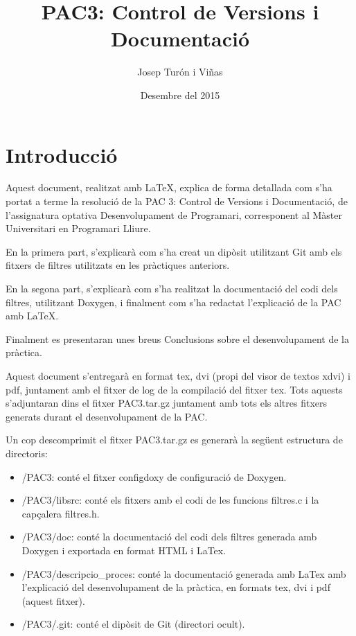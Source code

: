\documentclass{article}
\begin{document}
\title{PAC3: Control de Versions i Documentació} 
\author{Josep Turón i Viñas}
\date{Desembre del 2015}
\maketitle
\newpage
\section{Introducció}
Aquest document, realitzat amb \LaTeX, explica de forma detallada com s'ha portat a terme la resolució de la PAC 3: Control de Versions i Documentació, de l'assignatura optativa Desenvolupament de Programari, corresponent al Màster Universitari en Programari Lliure.\bigskip

En la primera part, s'explicarà com s'ha creat un dipòsit utilitzant Git amb els fitxers de filtres utilitzats en les pràctiques anteriors.\bigskip

En la segona part, s'explicarà com s'ha realitzat la documentació del codi dels filtres, utilitzant Doxygen, i finalment com s'ha redactat l'explicació de la PAC amb LaTeX. \bigskip

Finalment es presentaran unes breus Conclusions sobre el desenvolupament de la pràctica.\bigskip

Aquest document s'entregarà en format tex, dvi (propi del visor de textos xdvi) i pdf, juntament amb el fitxer de log de la compilació del fitxer tex. Tots aquests s'adjuntaran dins el fitxer PAC3.tar.gz juntament amb tots els altres fitxers generats durant el desenvolupament de la PAC.\bigskip

Un cop descomprimit el fitxer PAC3.tar.gz es generarà la següent estructura de directoris:
\begin{itemize}
\item /PAC3: conté el fitxer configdoxy de configuració de Doxygen.

\item /PAC3/libsrc: conté els fitxers amb el codi de les funcions filtres.c i la capçalera filtres.h.

\item /PAC3/doc: conté la documentació del codi dels filtres generada amb Doxygen i exportada en format HTML i LaTex.

\item /PAC3/descripcio\_proces: conté la documentació generada amb LaTex amb l'explicació del desenvolupament de la pràctica, en formats tex, dvi i pdf (aquest fitxer).

\item /PAC3/.git: conté el dipòsit de Git (directori ocult).
\end{itemize}
\newpage
\end{document}

